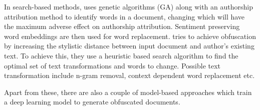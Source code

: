 In search-based methods, \cite{mahmood2019girl} uses genetic algorithms (GA) along with an authorship attribution method to identify words in a document, changing which will have the maximum adverse effect on authorship attribution.
%
Sentiment preserving word embeddings are then used for word replacement.
%
\cite{bevendorff2019heuristic} tries to achieve obfuscation by increasing the stylistic distance between input document and author's existing text.
%
To achieve this, they use a heuristic based search algorithm to find the optimal set of text transformations and words to change.
%
Possible text transformation include n-gram removal, context dependent word replacement etc.

Apart from these, there are also a couple of model-based approaches \cite{shetty2018a4nt, emmery2018style} which train a deep learning model to generate obfuscated documents.
